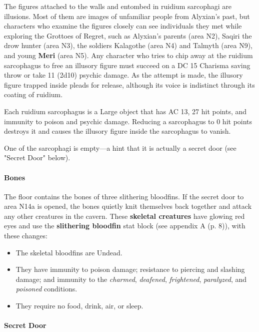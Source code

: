 \documentclass[letterpaper, 11pt, bg=full, twocolumn]{dndbook}
\begin{document}
The figures attached to the walls and entombed in ruidium sarcophagi are illusions. Most of them are images of unfamiliar people from Alyxian's past, but characters who examine the figures closely can see individuals they met while exploring the Grottoes of Regret, such as Alyxian's parents (area N2), Saqiri the drow hunter (area N3), the soldiers Kalagothe (area N4) and Talmyth (area N9), and young \textbf{Meri} (area N5). Any character who tries to chip away at the ruidium sarcophagus to free an illusory figure must succeed on a DC 15 Charisma saving throw or take 11 (2d10) psychic damage. As the attempt is made, the illusory figure trapped inside pleads for release, although its voice is indistinct through its coating of ruidium.

Each ruidium sarcophagus is a Large object that has AC 13, 27 hit points, and immunity to poison and psychic damage. Reducing a sarcophagus to 0 hit points destroys it and causes the illusory figure inside the sarcophagus to vanish.

One of the sarcophagi is empty---a hint that it is actually a secret door (see "Secret Door" below).

\paragraph{Bones}

The floor contains the bones of three slithering bloodfins. If the secret door to area N14a is opened, the bones quietly knit themselves back together and attack any other creatures in the cavern. These \textbf{skeletal creatures} have glowing red eyes and use the \textbf{slithering bloodfin} stat block (see appendix A (p. 8)), with these changes:

\begin{itemize}
\item The skeletal bloodfins are Undead.
\item They have immunity to poison damage; resistance to piercing and slashing damage; and immunity to the \textit{charmed}, \textit{deafened}, \textit{frightened}, \textit{paralyzed}, and \textit{poisoned} conditions.
\item They require no food, drink, air, or sleep.
\end{itemize}

\paragraph{Secret Door}
\end{document}
